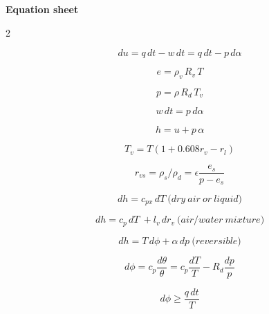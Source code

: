 \documentclass[12pt]{article}
\begin{document}
\begin{center}
  \textbf{Equation sheet}
\end{center}

\begin{multicols}{2}

  \begin{equation}
\label{eq:first}
du = q\,dt - w\,dt = q\,dt - p\,d\alpha
  \end{equation}

\begin{equation}
e = \rho_v\, R_v\, T
\end{equation}

\begin{equation}
p = \rho\, R_d\, T_v
\label{eq:eqstate}
\end{equation}


\begin{equation}
w \,dt = p\,d\alpha
\end{equation}

\begin{equation}
h = u + p \,\alpha
\end{equation}

\begin{equation}
  \label{eq:tv}
  T_v = T(1 + 0.608 r_v - r_l)
\end{equation}

\begin{equation}
  \label{eq:wv}
  r_{vs} = \rho_s/\rho_d = \epsilon \frac{e_s}{p - e_s}
\end{equation}

\begin{equation}
dh = c_{px}\, dT\ \mathrm(dry\ air\ or\ liquid)
\end{equation}

\begin{equation}
dh = c_p\, dT\ + l_v\,dr_v\ \mathrm(air/water\ mixture)
\label{eq:dhdef}
\end{equation}


\begin{equation}
dh = T\,d\phi + \alpha\,dp\ \mathrm(reversible)
\label{eq:reversible}
\end{equation}

\begin{equation}
d\phi = c_p \frac{d\theta}{\theta} = c_p \frac{dT}{T} - R_d \frac{dp}{p}
\label{eq:thetadef}
\end{equation}

\begin{equation}
  \label{eq:dphi}
  d\phi \geq \frac{q\,dt}{T}
\end{equation}


\end{multicols}
\end{document}
